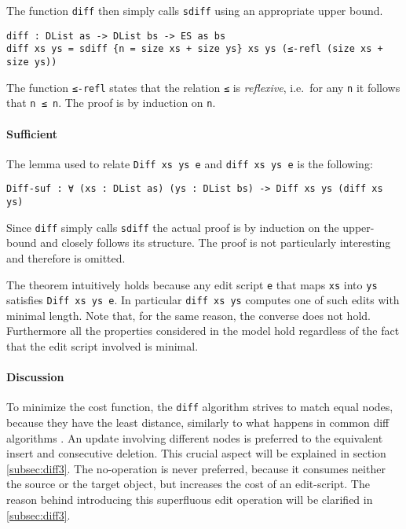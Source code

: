 \documentclass[../Thesis.tex]{subfiles}
\begin{document}
	The function \texttt{diff} then simply calls \texttt{sdiff} using an appropriate
	upper bound.
		
\begin{verbatim}
diff : DList as -> DList bs -> ES as bs
diff xs ys = sdiff {n = size xs + size ys} xs ys (≤-refl (size xs + size ys))
\end{verbatim}

	The function \texttt{≤-refl} states that the relation \texttt{≤} is 
	\emph{reflexive}, i.e.\ for any \texttt{n} it follows that \texttt{n ≤ n}.
	The proof is by induction on \texttt{n}.	 

	\paragraph{Sufficient}
	The lemma used to relate \texttt{Diff xs ys e} and \texttt{diff xs ys e} 
	is the following:
\begin{verbatim}	
Diff-suf : ∀ (xs : DList as) (ys : DList bs) -> Diff xs ys (diff xs ys)
\end{verbatim}

	Since \texttt{diff} simply calls \texttt{sdiff} 	 the actual proof is 
	by induction on the upper-bound and closely follows its
	structure. The proof is not particularly interesting and therefore is omitted.

	The theorem intuitively holds because any edit script \texttt{e} that maps 
	\texttt{xs} into \texttt{ys} satisfies \texttt{Diff xs ys e}.
	In particular \texttt{diff xs ys} computes one of such edits with minimal 
	length.
	Note that, for the same reason, the converse does not hold.
	Furthermore all the properties considered in the model hold regardless of 
	the fact that the edit script involved is minimal.
	
	\paragraph{Discussion}
	To minimize the cost function, the \texttt{diff} algorithm strives to 
	match equal nodes, because they have the least distance, similarly to 
	what happens in common diff algorithms \cite{Lemp09}.
	An update involving different nodes is preferred to the equivalent 
	insert and consecutive deletion. This crucial aspect will be explained
	in section \ref{subsec:diff3}.
	The no-operation is never preferred, because it consumes neither the
	source or the target object, but increases the cost of an edit-script.
	The reason behind introducing this superfluous edit operation	will be 
	clarified in \ref{subsec:diff3}.
\end{document}
